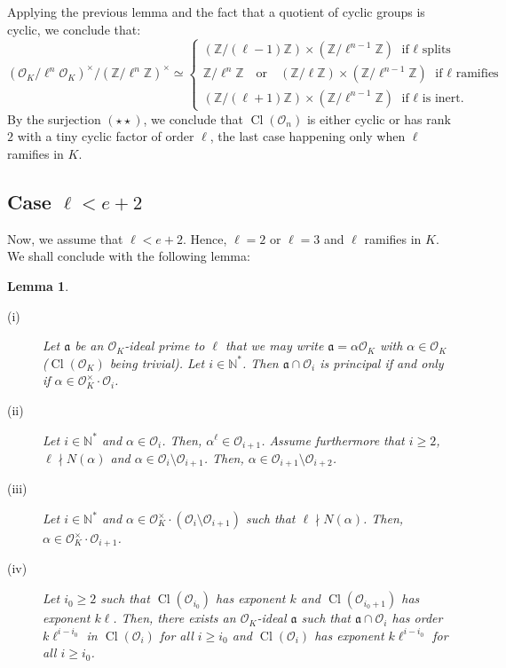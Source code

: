 \documentclass[a4paper,10pt,notitlepage]{report}
\theoremstyle{definition}
\theoremstyle{plain}
\newtheorem{Lemma}[Definition]{Lemma}
\theoremstyle{definition}
\newcommand{\N}{\mathbb{N}}
\newcommand{\Z}{\mathbb{Z}}
\newcommand{\mO}{\mathcal{O}}
\renewcommand{\(}{\left(}
\renewcommand{\)}{\right)}
\newcommand{\mf}[1]{\mathfrak{#1}}
\DeclareMathOperator{\Cl}{Cl}
\begin{document}
Applying the previous lemma and the fact that a quotient of cyclic groups is cyclic, we conclude that:
\[(\mO_K/\ell^n\mO_K)^\times/(\Z/\ell^n\Z)^\times \simeq \left\{ \begin{array}{l} 
(\Z/(\ell-1)\Z)\times(\Z/\ell^{n-1}\Z) \mbox{ if $\ell$ splits}\\
\Z/\ell^{n}\Z \quad \mbox{or} \quad (\Z/\ell\Z)\times(\Z/\ell^{n-1}\Z) \mbox{ if $\ell$ ramifies}\\ 
(\Z/(\ell+1)\Z)\times(\Z/\ell^{n-1}\Z)  \mbox{ if $\ell$ is inert.}
\end{array}\right.\]
By the surjection $(\star\star)$, we conclude that $\Cl(\mO_n)$ is either cyclic or has rank $2$ with a tiny cyclic factor of order $\ell$, the last case happening only when $\ell$ ramifies in $K$.

\subsection{Case $\ell< e+2$}

Now, we assume that $\ell< e+2$. Hence, $\ell=2$ or $\ell=3$ and $\ell$ ramifies in $K$.  We shall conclude with the following lemma:

\begin{Lemma}\label{Lemma 18}

\begin{description}
\item[(i)] Let $\mf{a}$ be an $\mO_K$-ideal prime to $\ell$ that we may write $\mf{a}=\alpha\mO_K$ with $\alpha\in\mO_K$ ($\Cl(\mO_K)$ being trivial). Let $i\in\N^*$. Then $\mf{a}\cap\mO_i$ is principal if and only if $\alpha\in\mO_K^\times\cdot \mO_i$.

\item[(ii)] Let $i\in\N^*$ and $\alpha\in\mO_i$. Then, $\alpha^\ell\in\mO_{i+1}$. Assume furthermore that $i\geq 2$, $\ell\nmid N(\alpha)$ and $\alpha\in\mO_i\setminus\mO_{i+1}$. Then, $\alpha\in\mO_{i+1}\setminus\mO_{i+2}$.

\item[(iii)] Let $i\in\N^*$ and $\alpha\in \mO_K^\times\cdot(\mO_i\setminus\mO_{i+1})$ such that $\ell\nmid N(\alpha)$. Then, $\alpha\in\mO_K^\times\cdot\mO_{i+1}$.

\item[(iv)] Let $i_0\geq 2$ such that $\Cl(\mO_{i_0})$ has exponent $k$ and $\Cl(\mO_{i_0+1})$ has exponent $k\ell$. Then, there exists an $\mO_K$-ideal $\mf{a}$ such that $\mf{a}\cap\mO_i$ has order $k\ell^{i-i_0}$ in $\Cl(\mO_i)$ for all $i\geq i_0$ and $\Cl(\mO_i)$ has exponent $k\ell^{i-i_0}$ for all $i\geq i_0$.
\end{description}
\end{Lemma}
\end{document}
